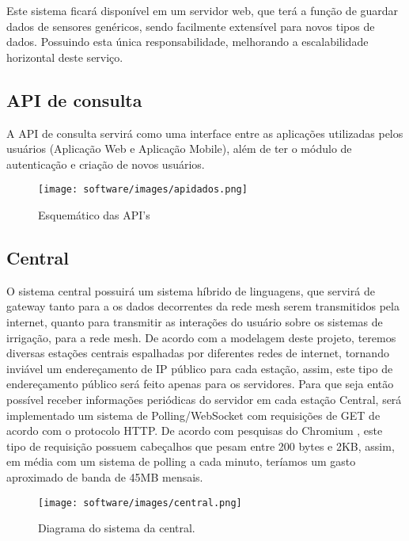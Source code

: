     Este sistema ficará disponível em um servidor web, que terá a função de guardar dados de sensores genéricos, sendo facilmente extensível para novos tipos de dados. Possuindo esta única responsabilidade, melhorando a escalabilidade horizontal deste serviço.

    \subsection{API de consulta}

    A API de consulta servirá como uma interface entre as aplicações utilizadas pelos usuários (Aplicação Web e Aplicação Mobile), além de ter o módulo de autenticação e criação de novos usuários.

    \begin{figure}[H]
        \texttt{[image: software/images/apidados.png]}
        \caption{Esquemático das API's}
        \label{fig:apidados}
    \end{figure}

    \subsection{Central}

    O sistema central possuirá um sistema híbrido de linguagens, que servirá de gateway  tanto para a os dados decorrentes da rede mesh serem transmitidos pela internet, quanto para transmitir as interações do usuário sobre os sistemas de irrigação, para a rede mesh. 
	De acordo com a modelagem deste projeto, teremos diversas estações centrais espalhadas por diferentes redes de internet, tornando inviável um endereçamento de IP público para cada estação, assim, este tipo de endereçamento público será feito apenas para os servidores.
    Para que seja então possível receber informações periódicas do servidor em cada estação Central, será implementado um sistema de Polling/WebSocket com requisições de GET de acordo com o protocolo HTTP. De acordo com pesquisas do Chromium \cite{chromium}, este tipo de requisição possuem cabeçalhos que pesam entre 200 bytes e 2KB, assim, em média com um sistema de polling a cada minuto, teríamos um gasto aproximado de banda de 45MB mensais.
    
    \begin{figure}[H]
        \texttt{[image: software/images/central.png]}
        \caption{Diagrama do sistema da central.}
        \label{fig:central}
    \end{figure}

